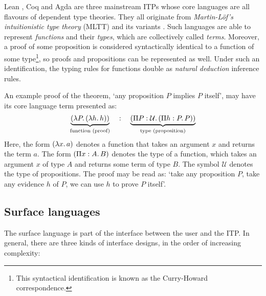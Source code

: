 \documentclass[twoside]{report}
\begin{document}
\begin{example}
Lean \cite{moura2021lean}, Coq \cite{coq2024proof} and Agda \cite{norell2007towards} are three mainstream ITPs whose core languages are all flavours of dependent type theories. They all originate from \emph{Martin-Löf's intuitionistic type theory} (MLTT) \cite{martin1984intuitionistic} and its variants \cite{coquand1988calculus,luo1990extended}. Such languages are able to represent \emph{functions} and their \emph{types}, which are collectively called \emph{terms}. Moreover, a proof of some proposition is considered syntactically identical to a function of some type\footnote{This syntactical identification is known as the Curry-Howard correspondence.}, so proofs and propositions can be represented as well. Under such an identification, the typing rules for functions double as \emph{natural deduction} inference rules.

An example proof of the theorem, `any proposition $P$ implies $P$ itself', may have its core language term presented as:
$$\underbrace{(\lambda{P}.\,{(\lambda{h}.\,{h})})}_{\text{function (proof)}} \quad : \quad \underbrace{(\Pi{P} : {\mathcal U}.\,{(\Pi{h} : {P}.\,{P})})}_{\text{type (proposition)}}$$
Here, the form $(\lambda{x}.\,{a})$ denotes a function that takes an argument $x$ and returns the term $a$. The form $(\Pi{x} : {A}.\,{B})$ denotes the type of a function, which takes an argument $x$ of type $A$ and returns some term of type $B$. The symbol $\mathcal U$ denotes the type of propositions. The proof may be read as: `take any proposition $P$, take any evidence $h$ of $P$, we can use $h$ to prove $P$ itself'.
\end{example}

\subsection*{Surface languages}

The surface language is part of the interface between the user and the ITP. In general, there are three kinds of interface designs, in the order of increasing complexity:
\end{document}
